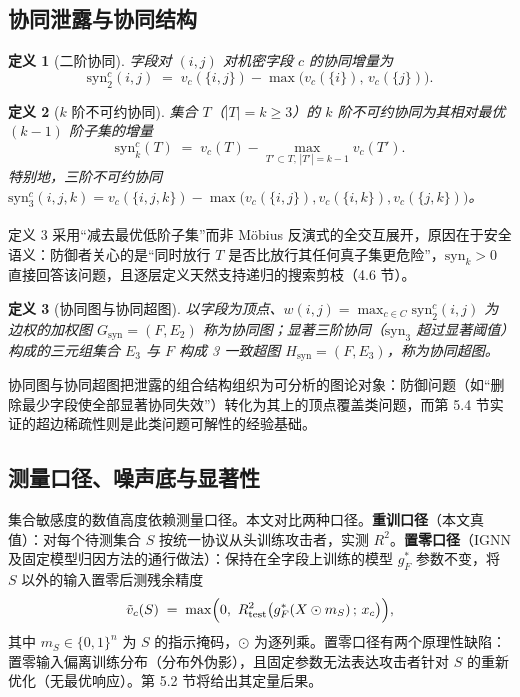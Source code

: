 \documentclass[10.5pt,compsoc,UTF8]{CjC}
\theoremstyle{mystyle}
\newtheorem{definition}{定义}
\newcommand{\upcite}[1]{\textsuperscript{\cite{#1}}}
\begin{document}
\subsection{协同泄露与协同结构}

\begin{definition}[二阶协同]
字段对 $(i,j)$ 对机密字段 $c$ 的协同增量为
\begin{equation}
\mathrm{syn}_2^c(i,j)\;=\;v_c(\{i,j\})-\max\bigl(v_c(\{i\}),\,v_c(\{j\})\bigr).
\label{eq:syn2}
\end{equation}
\end{definition}

\begin{definition}[$k$ 阶不可约协同]
集合 $T$（$|T|=k\ge 3$）的 $k$ 阶不可约协同为其相对最优 $(k{-}1)$ 阶子集的增量
\begin{equation}
\mathrm{syn}_k^c(T)\;=\;v_c(T)-\max_{T'\subset T,\,|T'|=k-1} v_c(T').
\label{eq:synk}
\end{equation}
特别地，三阶不可约协同 $\mathrm{syn}_3^c(i,j,k)=v_c(\{i,j,k\})-\max\bigl(v_c(\{i,j\}),v_c(\{i,k\}),v_c(\{j,k\})\bigr)$。
\end{definition}

定义 3 采用“减去最优低阶子集”而非 M\"obius 反演式的全交互展开\upcite{grabisch1999interaction}，原因在于安全语义：防御者关心的是“同时放行 $T$ 是否比放行其任何真子集更危险”，$\mathrm{syn}_k>0$ 直接回答该问题，且逐层定义天然支持递归的搜索剪枝（4.6 节）。

\begin{definition}[协同图与协同超图]
以字段为顶点、$w(i,j)=\max_{c\in C}\mathrm{syn}_2^c(i,j)$ 为边权的加权图 $G_{\mathrm{syn}}=(F,E_2)$ 称为协同图；显著三阶协同（$\mathrm{syn}_3$ 超过显著阈值）构成的三元组集合 $E_3$ 与 $F$ 构成 3 一致超图 $H_{\mathrm{syn}}=(F,E_3)$，称为协同超图。
\end{definition}

协同图与协同超图把泄露的组合结构组织为可分析的图论对象：防御问题（如“删除最少字段使全部显著协同失效”）转化为其上的顶点覆盖类问题，而第 5.4 节实证的超边稀疏性则是此类问题可解性的经验基础。

\subsection{测量口径、噪声底与显著性}

集合敏感度的数值高度依赖测量口径。本文对比两种口径。\textbf{重训口径}（本文真值）：对每个待测集合 $S$ 按统一协议从头训练攻击者，实测 $R^2$。\textbf{置零口径}（IGNN 及固定模型归因方法的通行做法）：保持在全字段上训练的模型 $g^{*}_{F}$ 参数不变，将 $S$ 以外的输入置零后测残余精度
\begin{equation}
\tilde v_c(S)\;=\;\max\Bigl(0,\ R^2_{\mathrm{test}}\bigl(g^{*}_{F}(X\odot m_S)\,;\,x_c\bigr)\Bigr),
\label{eq:zero}
\end{equation}
其中 $m_S\in\{0,1\}^{n}$ 为 $S$ 的指示掩码，$\odot$ 为逐列乘。置零口径有两个原理性缺陷：置零输入偏离训练分布（分布外伪影），且固定参数无法表达攻击者针对 $S$ 的重新优化（无最优响应）。第 5.2 节将给出其定量后果。
\end{document}
